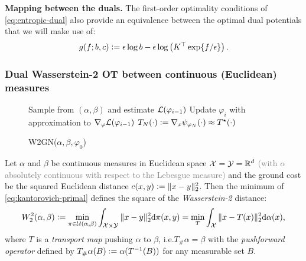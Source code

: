 \documentclass{article}
\newcommand{\ie}{i.e.\xspace}
\newcommand{\defeq}{\vcentcolon=}
\begin{document}
\textbf{Mapping between the duals.}
The first-order optimality conditions of \cref{eq:entropic-dual}
also provide an equivalence between the optimal dual potentials
that we will make use of:
\begin{equation}
  g(f; b, c) \defeq \epsilon \log b - \epsilon\log\left(
    K^\top \exp\{f/\epsilon\}\right).
  \label{eq:f-to-g}
\end{equation}


\subsubsection{Dual Wasserstein-2 OT between continuous (Euclidean) measures}
\label{sec:prelim:continuous}
\begin{figure}
  \vspace{-10mm}
  \begin{minipage}{0.48\textwidth}
    \begin{algorithm}[H]
      \caption{\footnotesize W2GN($\alpha, \beta, \varphi_0$)}
      \begin{algorithmic}
        \footnotesize
        \State Sample from $(\alpha,\beta)$ and estimate ${\mathcal{L}}(\varphi_{i-1})$
        \State Update $\varphi_i$ with approximation to $\nabla_\varphi {\mathcal{L}}(\varphi_{i-1})$
        \EndFor
        \State \Return $T_N(\cdot)\defeq\nabla_x \psi_{\varphi_N}(\cdot) \approx T^\star(\cdot)$
      \end{algorithmic}
      \label{alg:w2gn}
    \end{algorithm}
  \end{minipage}
  \vspace{-6mm}
\end{figure}

Let $\alpha$ and $\beta$ be continuous measures in Euclidean
space ${\mathcal{X}}={\mathcal{Y}}=\mathbb{R}^d$ \textcolor{gray}{(with $\alpha$ absolutely continuous
with respect to the Lebesgue measure)} and the ground cost be
the squared Euclidean distance
$c(x,y)\defeq\|x-y\|_2^2$.
Then the minimum of \cref{eq:kantorovich-primal} defines
the square of the \emph{Wasserstein-2} distance:
\begin{equation}
  W_2^2(\alpha,\beta) \defeq \min_{\pi\in\gU(\alpha, \beta)}
    \int_{\gX\times \gY} \|x-y\|_2^2{\rm d}\pi(x,y)
    =
    \min_{T}\int_\gX \|x-T(x)\|_2^2{\rm d}\alpha(x),
  \label{eq:W2}
\end{equation}
where $T$ is a \emph{transport map} pushing
$\alpha$ to $\beta$, \ie $T_{\#}\alpha=\beta$
with the \emph{pushforward operator}
defined by $T_{\#}\alpha(B) \defeq \alpha(T^{-1}(B))$
for any measurable set $B$.
\end{document}
